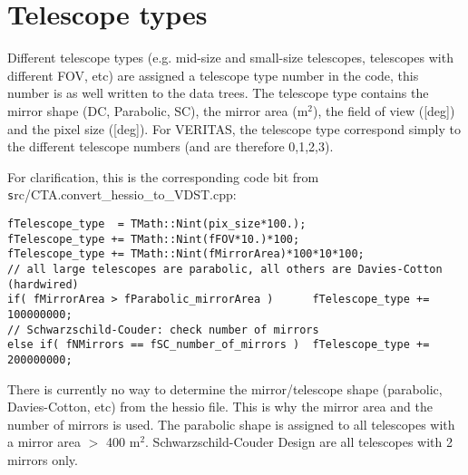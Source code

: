 \documentclass[titlepage,a4paper,twoside,11pt]{report}
\begin{document}
\section{Telescope types}

Different telescope types (e.g. mid-size and small-size telescopes, telescopes with different FOV, etc) are assigned a telescope type number in the code, this number is as well written to the data trees. The telescope type  contains the mirror shape (DC, Parabolic, SC), the mirror area (m$^2$), the field of view ([deg]) and the pixel size ([deg]). For VERITAS, the telescope type correspond simply to the different telescope numbers (and are therefore 0,1,2,3).

For clarification, this is the corresponding code bit from {\texttt src/CTA.convert\_hessio\_to\_VDST.cpp}:

\begin{lstlisting}
fTelescope_type  = TMath::Nint(pix_size*100.);
fTelescope_type += TMath::Nint(fFOV*10.)*100;
fTelescope_type += TMath::Nint(fMirrorArea)*100*10*100;
// all large telescopes are parabolic, all others are Davies-Cotton (hardwired)
if( fMirrorArea > fParabolic_mirrorArea )      fTelescope_type += 100000000;
// Schwarzschild-Couder: check number of mirrors
else if( fNMirrors == fSC_number_of_mirrors )  fTelescope_type += 200000000;
\end{lstlisting}

 There is currently no way to determine the mirror/telescope shape (parabolic, Davies-Cotton, etc) from the hessio file. This is why the mirror area and the number of mirrors is used. 
The parabolic shape is assigned to all telescopes with a mirror area  $>$ 400 m$^2$.
Schwarzschild-Couder Design are all telescopes with 2 mirrors only.





%
%
%

\end{document}
